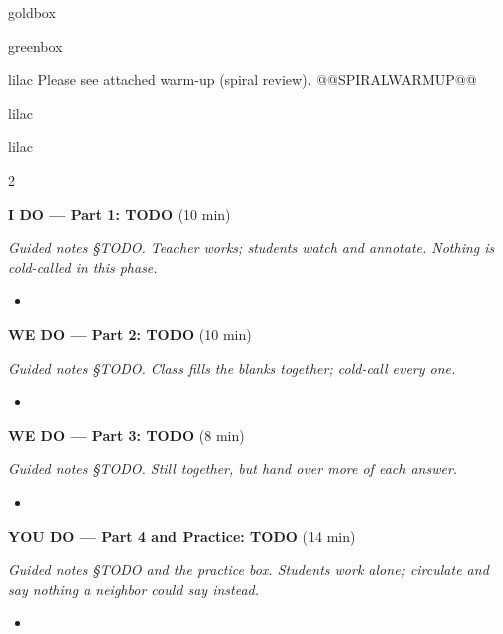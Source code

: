 \documentclass[10pt]{article}
\begin{document}
\renewcommand{\arraystretch}{1.6}
\begin{skillbox}{goldbox}
\end{skillbox}

\begin{skillbox}{greenbox}
\end{skillbox}

\begin{skillbox}{lilac}
    Please see attached warm-up (spiral review).
@@SPIRALWARMUP@@
\end{skillbox}

\begin{skillbox}{lilac}
\end{skillbox}

\begin{skillbox}{lilac}
\begin{multicols}{2}

\textbf{I DO --- Part 1: TODO} (10 min)

\textit{Guided notes \S TODO. Teacher works; students watch and annotate. Nothing
is cold-called in this phase.}
\begin{itemize}
  \item %
\end{itemize}

\textbf{WE DO --- Part 2: TODO} (10 min)

\textit{Guided notes \S TODO. Class fills the blanks together; cold-call every one.}
\begin{itemize}
  \item %
\end{itemize}

\columnbreak

\textbf{WE DO --- Part 3: TODO} (8 min)

\textit{Guided notes \S TODO. Still together, but hand over more of each answer.}
\begin{itemize}
  \item %
\end{itemize}

\textbf{YOU DO --- Part 4 and Practice: TODO} (14 min)

\textit{Guided notes \S TODO and the practice box. Students work alone; circulate
and say nothing a neighbor could say instead.}
\begin{itemize}
  \item %
\end{itemize}
\end{multicols}
\end{skillbox}
\end{document}
